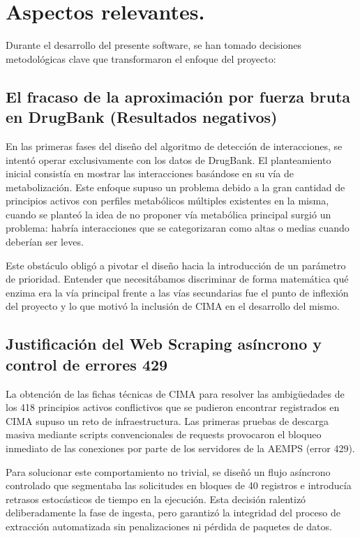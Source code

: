 \section{Aspectos relevantes.}
Durante el desarrollo del presente software, se han tomado decisiones metodológicas clave que transformaron el enfoque del proyecto:

\subsection*{El fracaso de la aproximación por fuerza bruta en DrugBank (Resultados negativos)}
En las primeras fases del diseño del algoritmo de detección de interacciones, se intentó operar exclusivamente con los datos de DrugBank. El planteamiento inicial consistía en mostrar las interacciones basándose  en su vía de metabolización. Este enfoque supuso un problema debido a la gran cantidad de principios activos con perfiles metabólicos múltiples existentes en la misma,  cuando se planteó la idea de no proponer vía metabólica principal surgió un problema: habría interacciones que se categorizaran como altas o medias cuando deberían ser leves.

Este obstáculo obligó a pivotar el diseño hacia la introducción de un parámetro de prioridad. Entender que necesitábamos discriminar de forma matemática qué enzima era la vía principal frente a las vías secundarias fue el punto de inflexión del proyecto y lo que motivó la inclusión de CIMA en el desarrollo del mismo.


\subsection*{Justificación del Web Scraping asíncrono y control de errores 429}
La obtención de las fichas técnicas de CIMA para resolver las ambigüedades de los 418 principios activos conflictivos que se pudieron encontrar registrados en CIMA supuso un reto de infraestructura. Las primeras pruebas de descarga masiva mediante scripts convencionales de requests provocaron el bloqueo inmediato de las conexiones por parte de los servidores de la AEMPS (error 429). 

Para solucionar este comportamiento no trivial, se diseñó un flujo asíncrono controlado que segmentaba las solicitudes en bloques de 40 registros e introducía retrasos estocásticos de tiempo en la ejecución. Esta decisión ralentizó deliberadamente la fase de ingesta, pero garantizó la integridad del proceso de extracción automatizada sin penalizaciones ni pérdida de paquetes de datos.

